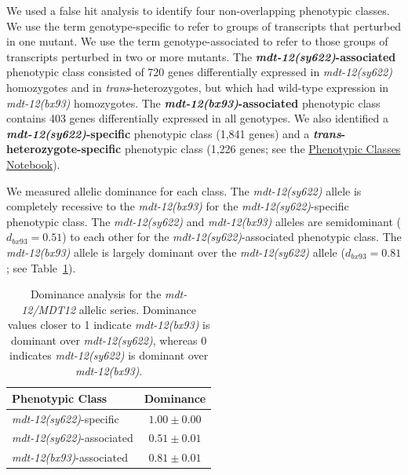 \documentclass[8pt, twocolumn]{article}
\newcommand{\gene}[1]{\mbox{\emph{#1}}}
\newcommand{\dpy}[1]{\gene{mdt-12#1}}
\newcommand{\bx}{\dpy{(bx93)}}
\newcommand{\sy}{\dpy{(sy622)}}
\begin{document}
We used a false hit analysis to identify four non-overlapping phenotypic
classes. We use the term genotype-specific to refer to groups of
transcripts that perturbed in one mutant. We use the term
genotype-associated to refer to those groups of transcripts  perturbed in two or
more mutants. The \textbf{\sy{}-associated} phenotypic class consisted
of 720 genes differentially expressed in \sy{} homozygotes and in
\emph{trans}-heterozygotes, but which had wild-type expression in \bx{}
homozygotes. The \textbf{\bx{}-associated} phenotypic class contains 403
genes differentially expressed in all genotypes. We also identified a
\textbf{\sy{}-specific} phenotypic class (1,841 genes) and a
\textbf{\emph{trans}-heterozygote-specific} phenotypic class (1,226 genes; see
the
\href{https://wormlabcaltech.github.io/med-cafe/notebook/phenotypic_classes.html}{
Phenotypic Classes Notebook}).

We measured allelic dominance for each class. The \sy{} allele is
completely recessive to the \bx{} for the \sy{}-specific phenotypic
class. The \sy{} and \bx{} alleles are semidominant ($d_{bx93} =
0.51$) to each other for the \sy{}-associated phenotypic class. The
\bx{} allele is largely  dominant over the \sy{} allele
($d_{bx93}=0.81$; see Table~\ref{tab:dom}).

\begin{table}
  \centering
  \begin{tabular}{lc}
    \toprule
    Phenotypic Class & Dominance\\
    \midrule
    \sy{}-specific & $1.00\pm0.00$\\
    \sy{}-associated & $0.51\pm0.01$\\
    \bx{}-associated & $0.81\pm0.01$\\
    \bottomrule
  \end{tabular}
  \caption{Dominance analysis for the \dpy{/MDT12} allelic series. Dominance
  values closer to 1 indicate \bx{} is dominant over \sy{}, whereas 0 indicates
  \sy{} is dominant over \bx{}.}
\label{tab:dom}

\end{table}
\end{document}
